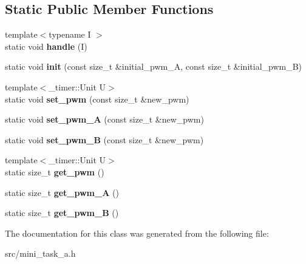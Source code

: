 \subsection*{Static Public Member Functions}
\begin{DoxyCompactItemize}
\item 
{\footnotesize template$<$typename I $>$ }\\static void {\bfseries handle} (I)\hypertarget{classPwm_a4b0e7aee2bc275397e72f5a548e479f1}{}\label{classPwm_a4b0e7aee2bc275397e72f5a548e479f1}

\item 
static void {\bfseries init} (const size\+\_\+t \&initial\+\_\+pwm\+\_\+A, const size\+\_\+t \&initial\+\_\+pwm\+\_\+B)\hypertarget{classPwm_ab13355852b2542a347272c2e7ba59c93}{}\label{classPwm_ab13355852b2542a347272c2e7ba59c93}

\item 
{\footnotesize template$<$\+\_\+timer\+::\+Unit U$>$ }\\static void {\bfseries set\+\_\+pwm} (const size\+\_\+t \&new\+\_\+pwm)\hypertarget{classPwm_a83d86e1254dcc081e0ed0d979c0dab7c}{}\label{classPwm_a83d86e1254dcc081e0ed0d979c0dab7c}

\item 
static void {\bfseries set\+\_\+pwm\+\_\+A} (const size\+\_\+t \&new\+\_\+pwm)\hypertarget{classPwm_a050bd4fb360d94f5538fc22b187149c3}{}\label{classPwm_a050bd4fb360d94f5538fc22b187149c3}

\item 
static void {\bfseries set\+\_\+pwm\+\_\+B} (const size\+\_\+t \&new\+\_\+pwm)\hypertarget{classPwm_a077fde815602fffbcf57a7959ee6e5cc}{}\label{classPwm_a077fde815602fffbcf57a7959ee6e5cc}

\item 
{\footnotesize template$<$\+\_\+timer\+::\+Unit U$>$ }\\static size\+\_\+t {\bfseries get\+\_\+pwm} ()\hypertarget{classPwm_a3b5d5335c48c1a4027890ae4ea4d25fe}{}\label{classPwm_a3b5d5335c48c1a4027890ae4ea4d25fe}

\item 
static size\+\_\+t {\bfseries get\+\_\+pwm\+\_\+A} ()\hypertarget{classPwm_a565023d9bf553023363329a29b8a03a9}{}\label{classPwm_a565023d9bf553023363329a29b8a03a9}

\item 
static size\+\_\+t {\bfseries get\+\_\+pwm\+\_\+B} ()\hypertarget{classPwm_a2dbc254931f58ae344b44c9b3c6e9406}{}\label{classPwm_a2dbc254931f58ae344b44c9b3c6e9406}

\end{DoxyCompactItemize}


The documentation for this class was generated from the following file\+:\begin{DoxyCompactItemize}
\item 
src/mini\+\_\+task\+\_\+a.\+h\end{DoxyCompactItemize}
